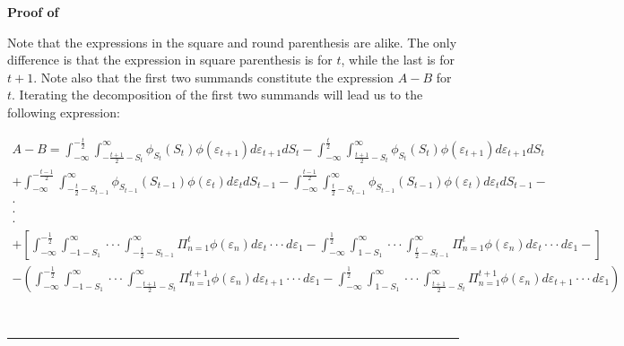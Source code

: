 \documentclass[12pt]{article}
\newenvironment{proof}[1][Proof of]{\noindent\textbf{#1} }{\ \rule{0.5em}{0.5em}}
\begin{document}
\begin{proof}
\begin{enumerate}[label={\roman*})]
Note that the expressions in the square and  round parenthesis are alike. The only difference is that the expression in square parenthesis is for $t$, while the last is for $t+1$. Note also that the first two summands constitute the expression $A-B$ for $t$. Iterating the decomposition of the first two summands will lead us to the following expression:

\tiny
\begin{equation}
\begin{aligned}
A-B = \int_{-\infty}^{-\frac{t}{2}}\int^{\infty}_{-\frac{t+1}{2}-S_t}\phi_{S_t}(S_t)\phi(\varepsilon_{t+1})d\varepsilon_{t+1} dS_t
-
\int_{-\infty}^{\frac{t}{2}}\int^{\infty}_{\frac{t+1}{2}-S_t}\phi_{S_{t}}(S_{t})\phi(\varepsilon_{t+1})d\varepsilon_{t+1} dS_{t} 
\\
+\int_{-\infty}^{-\frac{t-1}{2}}\int^{\infty}_{-\frac{t}{2}-S_{t-1}}\phi_{S_{t-1}}(S_{t-1})\phi(\varepsilon_{t})d\varepsilon_{t} dS_{t-1}
-
\int_{-\infty}^{\frac{t-1}{2}}\int^{\infty}_{\frac{t}{2}-S_{t-1}}\phi_{S_{t-1}}(S_{t-1})\phi(\varepsilon_{t})d\varepsilon_{t} dS_{t-1}-
\\
\cdot\\
 \cdot\\
  \cdot\\
+
\left[
\int_{-\infty}^{-\frac{1}{2}} \int^{\infty}_{-1-S_1}\cdot\cdot\cdot \int^{\infty}_{-\frac{t}{2}-S_{t-1}} \Pi_{n=1}^{t} \phi(\varepsilon_n) d\varepsilon_{t} \cdot \cdot \cdot d \varepsilon_{1}
-
 \int_{-\infty}^{\frac{1}{2}} \int^{\infty}_{1-S_1}\cdot\cdot\cdot \int^{\infty}_{\frac{t}{2}-S_{t-1}} \Pi_{n=1}^{t} \phi(\varepsilon_n) d\varepsilon_{t} \cdot \cdot \cdot d \varepsilon_{1} - \right] \\
-
\left( 
\int_{-\infty}^{-\frac{1}{2}} \int^{\infty}_{-1-S_1}\cdot\cdot\cdot \int^{\infty}_{-\frac{t+1}{2}-S_{t}} \Pi_{n=1}^{t+1} \phi(\varepsilon_n) d\varepsilon_{t+1} \cdot \cdot \cdot d \varepsilon_{1}
-
\int_{-\infty}^{\frac{1}{2}} \int^{\infty}_{1-S_1}\cdot\cdot\cdot \int^{\infty}_{\frac{t+1}{2}-S_{t}} \Pi_{n=1}^{t+1} \phi(\varepsilon_n) d\varepsilon_{t+1} \cdot \cdot \cdot d \varepsilon_{1}
\right)
\end{aligned}
\end{equation}
\normalsize





\end{enumerate}
\end{proof}
\end{document}
